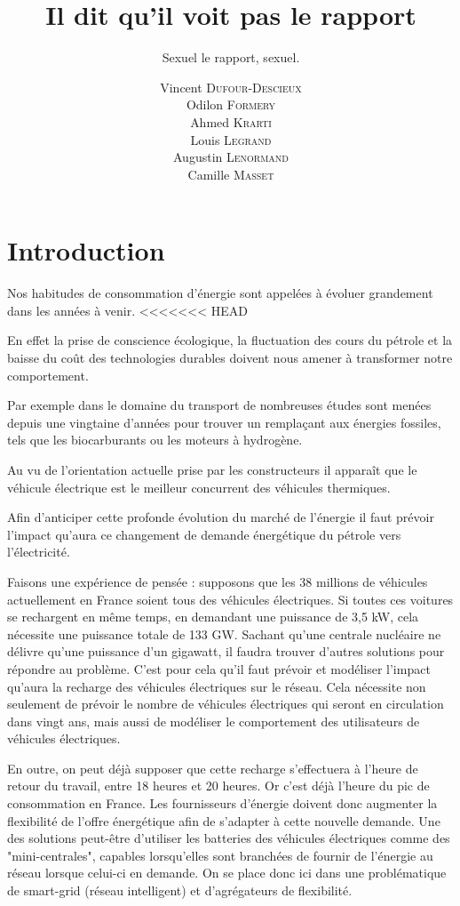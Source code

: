 \documentclass[10pt]{article}
\title{Il dit qu'il voit pas le rapport}
\subtitle{Sexuel le rapport, sexuel.}
\author{ Vincent \textsc{Dufour-Descieux} \\ Odilon \textsc{Formery} \\ Ahmed \textsc{Krarti} \\ Louis \textsc{Legrand} \\ Augustin \textsc{Lenormand} \\   Camille \textsc{Masset} }
\begin{document}
\maketitle
\section*{Introduction}

Nos habitudes de consommation d'énergie sont appelées à évoluer grandement dans les années à venir.
<<<<<<< HEAD

En effet la prise de conscience écologique, la fluctuation des cours du pétrole et la baisse du coût des technologies durables doivent nous amener à transformer notre comportement. 

Par exemple dans le domaine du transport de nombreuses études sont menées depuis une vingtaine d'années pour trouver un remplaçant aux énergies fossiles, tels que les biocarburants ou les moteurs à hydrogène.

Au vu de l'orientation actuelle prise par les constructeurs il apparaît que le véhicule électrique est le meilleur concurrent des véhicules thermiques. 

Afin d'anticiper cette profonde évolution du marché de l'énergie il faut prévoir l'impact qu'aura ce changement de demande énergétique du pétrole vers l'électricité. 



Faisons une expérience de pensée : supposons que les 38 millions de véhicules actuellement en France soient tous des véhicules électriques. Si toutes ces voitures se rechargent en même temps, en demandant une puissance de 3,5 kW, cela nécessite une puissance totale de 133 GW. Sachant qu'une centrale nucléaire ne délivre qu'une puissance d'un gigawatt, il faudra trouver d'autres solutions pour répondre au problème. C'est pour cela qu'il faut prévoir et modéliser l'impact qu'aura la recharge des véhicules électriques sur le réseau. Cela nécessite non seulement de prévoir le nombre de véhicules électriques qui seront en circulation dans vingt ans, mais aussi de modéliser le comportement des utilisateurs de véhicules électriques. 



En outre, on peut déjà supposer que cette recharge s'effectuera à l'heure de retour du travail, entre 18 heures et 20 heures. Or c'est déjà l'heure du pic de consommation en France. Les fournisseurs d'énergie doivent donc augmenter la flexibilité de l'offre énergétique afin de s'adapter à cette nouvelle demande. Une des solutions peut-être d'utiliser les batteries des véhicules électriques comme des "mini-centrales", capables lorsqu'elles sont branchées de fournir de l'énergie au réseau lorsque celui-ci en demande. On se place donc ici dans une problématique de smart-grid (réseau intelligent) et d'agrégateurs de flexibilité. 
\end{document}
